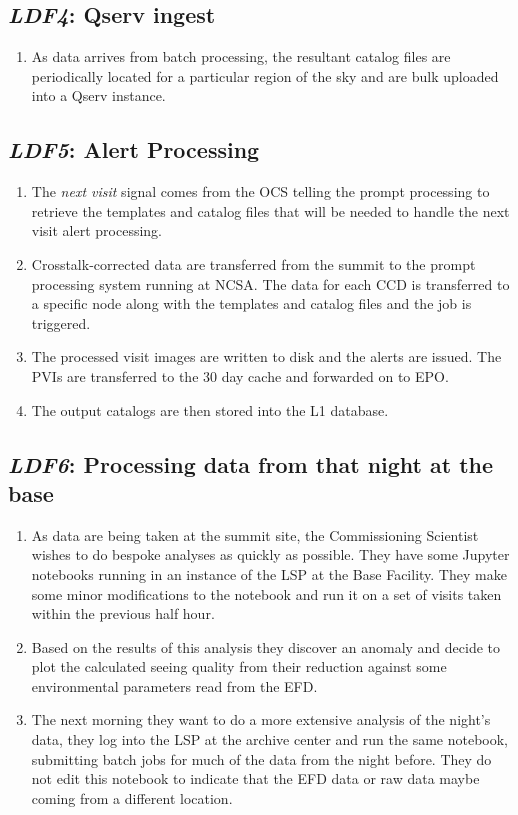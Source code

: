 \documentclass[DM,toc,lsstdraft]{lsstdoc}
\newcommand{\usecase}[3]{%
\subsection{\emph{#1}: #2}
\label{use:#1}
\begin{enumerate}[label=\alph*.]
#3
\end{enumerate}
}
\begin{document}
\usecase{LDF4}{Qserv ingest}{%

\item
As data arrives from batch processing, the resultant catalog files are periodically located for a particular region of the sky and are bulk uploaded into a Qserv instance.

}

\usecase{LDF5}{Alert Processing}{%

\item
The \emph{next visit} signal comes from the OCS telling the prompt processing to retrieve the templates and catalog files that will be needed to handle the next visit alert processing.

\item
Crosstalk-corrected data are transferred from the summit to the prompt processing system running at NCSA.
The data for each CCD is transferred to a specific node along with the templates and catalog files and the job is triggered.

\item
The processed visit images are written to disk and the alerts are issued.
The PVIs are transferred to the 30 day cache and forwarded on to EPO.

\item
The output catalogs are then stored into the L1 database.

}

\usecase{LDF6}{Processing data from that night at the base}{%

\item
As data are being taken at the summit site, the Commissioning Scientist wishes to do bespoke analyses as quickly as possible.
They have some Jupyter notebooks running in an instance of the LSP at the Base Facility.
They make some minor modifications to the notebook and run it on a set of visits taken within the previous half hour.

\item
Based on the results of this analysis they discover an anomaly and decide to plot the calculated seeing quality from their reduction against some environmental parameters read from the EFD.

\item
The next morning they want to do a more extensive analysis of the night's data, they log into the LSP at the archive center and run the same notebook, submitting batch jobs for much of the data from the night before.
They do not edit this notebook to indicate that the EFD data or raw data maybe coming from a different location.

}
\end{document}
